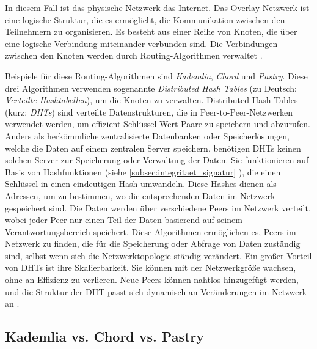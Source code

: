 \noindent In diesem Fall ist das physische Netzwerk das Internet. Das Overlay-Netzwerk ist eine logische Struktur, die es ermöglicht, die Kommunikation zwischen den Teilnehmern zu organisieren. Es besteht aus einer Reihe von Knoten, die über eine logische Verbindung miteinander verbunden sind. Die Verbindungen zwischen den Knoten werden durch Routing-Algorithmen verwaltet \parencite{Lua_P2POverlayNetworksPaper}.

Beispiele für diese Routing-Algorithmen sind \textit{Kademlia}, \textit{Chord} und \textit{Pastry}. Diese drei Algorithmen verwenden sogenannte \textit{Distributed Hash Tables} (zu Deutsch: \textit{Verteilte Hashtabellen}), um die Knoten zu verwalten. Distributed Hash Tables (kurz: \textit{DHTs}) sind verteilte Datenstrukturen, die in Peer-to-Peer-Netzwerken verwendet werden, um effizient Schlüssel-Wert-Paare zu speichern und abzurufen. Anders als herkömmliche zentralisierte Datenbanken oder Speicherlösungen, welche die Daten auf einem zentralen Server speichern, benötigen DHTs keinen solchen Server zur Speicherung oder Verwaltung der Daten. Sie funktionieren auf Basis von Hashfunktionen (siehe \ref{subsec:integritaet_signatur} \textit{}), die einen Schlüssel in einen eindeutigen Hash umwandeln. Diese Hashes dienen als Adressen, um zu bestimmen, wo die entsprechenden Daten im Netzwerk gespeichert sind. Die Daten werden über verschiedene Peers im Netzwerk verteilt, wobei jeder Peer nur einen Teil der Daten basierend auf seinem Verantwortungsbereich speichert. Diese Algorithmen ermöglichen es, Peers im Netzwerk zu finden, die für die Speicherung oder Abfrage von Daten zuständig sind, selbst wenn sich die Netzwerktopologie ständig verändert. Ein großer Vorteil von DHTs ist ihre Skalierbarkeit. Sie können mit der Netzwerkgröße wachsen, ohne an Effizienz zu verlieren. Neue Peers können nahtlos hinzugefügt werden, und die Struktur der DHT passt sich dynamisch an Veränderungen im Netzwerk an \parencites{Stoica_Chord}{Rowstron_Pastry}{Maymounkov_Kademlia}[S. 43-46]{Balakrishnan_LookingUpDataInP2PSystems}.


\subsection{Kademlia vs. Chord vs. Pastry}
\label{subsec:kademlia_vs_chord_vs_pastry}

